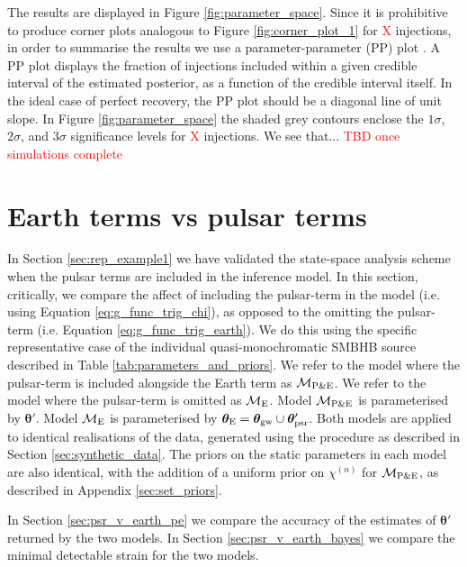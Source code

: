 \documentclass[fleqn,usenatbib,useAMS]{mnras}
\begin{document}
The results are displayed in Figure \ref{fig:parameter_space}. Since it is prohibitive to produce corner plots analogous to Figure \ref{fig:corner_plot_1} for \textcolor{red}{X} injections, in order to summarise the results we use a parameter-parameter (PP) plot \citep{doi:10.1198/106186006X136976}. A PP plot displays the fraction of injections included within a given credible interval of the estimated posterior, as a function of the credible interval itself. In the ideal case of perfect recovery, the PP plot should be a diagonal line of unit slope.  In Figure \ref{fig:parameter_space} the shaded grey contours enclose the $1\sigma$, $2\sigma$, and $3\sigma$ significance levels for \textcolor{red}{X} injections. We see that... \textcolor{red}{TBD once simulations complete}




\section{Earth terms vs pulsar terms}\label{sec:earth_vs_psr}
In Section \ref{sec:rep_example1} we have validated the state-space analysis scheme when the pulsar terms are included in the inference model. In this section, critically, we compare the affect of including the pulsar-term in the model (i.e. using Equation \eqref{eq:g_func_trig_chi}), as opposed to the omitting the pulsar-term (i.e. Equation \eqref{eq:g_func_trig_earth}). We do this using the specific representative case of the individual quasi-monochromatic SMBHB source described in Table \ref{tab:parameters_and_priors}. We refer to the model where the pulsar-term is included alongside the Earth term as $\mathcal{M}_{\rm P \& E}$. We refer to the model where the pulsar-term is omitted as 
$\mathcal{M}_{\rm E}$. Model $\mathcal{M}_{\rm P \& E}$ is parameterised by $\boldsymbol{\theta}'$. Model $\mathcal{M}_{\rm E}$ is parameterised by $\boldsymbol{\theta}_{\rm E} = \boldsymbol{\theta}_{\rm gw} \cup \boldsymbol{\theta}'_{\rm psr}$. Both models are applied to identical realisations of the data, generated using the procedure as described in Section  \ref{sec:synthetic_data}. The priors on the static parameters in each model are also identical, with the addition of a uniform prior on $\chi^{(n)}$ for $\mathcal{M}_{\rm P \& E}$, as described in Appendix \ref{sec:set_priors}. \newline 


In Section \ref{sec:psr_v_earth_pe} we compare the accuracy of the estimates of $\boldsymbol{\theta'}$ returned by the two models. In Section \ref{sec:psr_v_earth_bayes} we compare the minimal detectable strain for the two models. 
\end{document}
